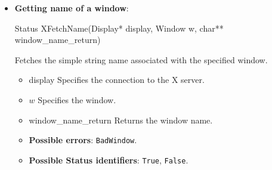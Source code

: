\documentclass{report}
\begin{document}
\begin{itemize}
\begin{itemize}
                    \item \textbf{Status identifiers}:
                        \begin{itemize}
                            \item \textbf{0}: Failure.
                            \item \textbf{Nonzero}: Success.
                        \end{itemize}
                \end{itemize}
            \item \textbf{Getting name of a window}:
                \bigbreak \noindent 
                \begin{cppcode}
                    Status XFetchName(Display* display, Window w, char** window_name_return)
                \end{cppcode}
                \bigbreak \noindent
                Fetches the simple string name associated with the specified window.
                \begin{itemize}
                    \item display Specifies the connection to the X server.
                    \item $w$ Specifies the window.
                    \item window\_name\_return Returns the window name.
                \end{itemize}
                \begin{itemize}
                    \item \textbf{Possible errors}: \texttt{BadWindow}.
                    \item \textbf{Possible Status identifiers}: \texttt{True}, \texttt{False}.
                \end{itemize}



    \end{itemize}

    \pagebreak 
\end{document}
